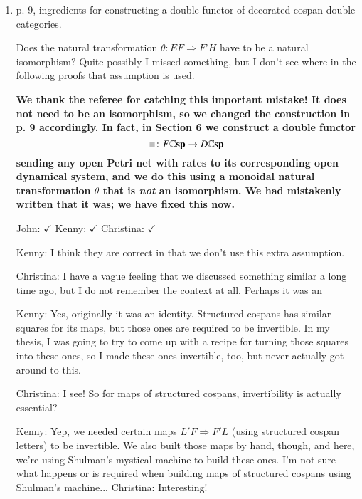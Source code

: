 \documentclass[reqno]{amsart}
\newcommand*{\graysquare}{\textcolor{lightgray}{\blacksquare}}
\newcommand{\double}[1]{\mathbf{\mathbb #1}}
\newcommand{\lCsp}{\double{Csp}}
\def\chris{\color{purple} Christina: }
\def\john{\color{red} John: }
\def\kenny{\color{blue} Kenny: }
\begin{document}
\begin{enumerate}
The diagram depicting the decoration morphism $\tau$ as a natural transformation, first shown explictly on p. 10, should be moved here since it is 
implicitly used at the beginning of p. 5 to define the decoration of horizontal composites.

{\bf We have moved the natural isomorphism triangle as equation (1) in the statement of Theorem 2.1, and we have referred to it at page 10.} 

{\chris $\checkmark$} {\kenny $\checkmark$} {\john $\checkmark$} 

\item p. 9, ingredients for constructing a double functor of decorated cospan double categories.

Does the natural transformation $\theta \colon EF \Rightarrow F’ H$ have to be a natural isomorphism? Quite possibly I missed something, but I don’t see where in 
the following proofs that assumption is used.

{\bf We thank the referee for catching this important mistake!   It does not need to be an isomorphism, so we changed the construction in p. 
9 accordingly. In fact, in Section 6 we construct a double functor
\[      \graysquare \colon F \lCsp \to D \lCsp \]
sending any open Petri net with rates to its corresponding open dynamical system, and we do this
using a monoidal natural transformation $\theta$ that is \emph{not} an isomorphism.  We had mistakenly written that it was; we have fixed this now.}

{\john $\checkmark$} {\kenny $\checkmark$} {\chris $\checkmark$}

\iffalse
{\kenny I think they are correct in that we don't use this extra assumption.}

{\chris I have a vague feeling that we discussed something similar a long time ago, but I do not remember the context at all. Perhaps it was an 

{\kenny Yes, originally it was an identity. Structured cospans has similar squares for its maps, but those ones are required to be invertible. In my 
thesis, I was going to try to come up with a recipe for turning those squares into these ones, so I made these ones invertible, too, but never 
actually got around to this.}

{\chris I see! So for maps of structured cospans, invertibility is actually essential?}

{\kenny Yep, we needed certain maps $L' F \Rightarrow F' L$ (using structured cospan letters) to be invertible. We also built those maps by hand, 
though, and here, we're using Shulman's mystical machine to build these ones. I'm not sure what happens or is required when building maps of 
structured cospans using Shulman's machine...} {\chris Interesting!}

}
\end{enumerate}
\end{document}

